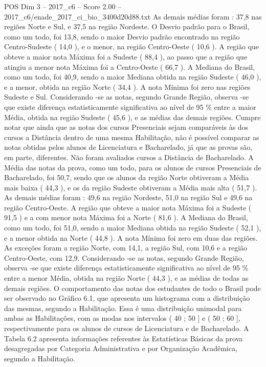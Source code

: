 \begin{textsample}{POS Dim 3 – 2017\_c6 – Score 2.00 – 2017\_c6/enade\_2017\_ci\_bio\_3400d20d88.txt}
As demais médias foram : 37,8 nas regiões Norte e Sul, e 37,5 na região Nordeste.
O Desvio padrão para o Brasil, como um todo, foi 13,8, sendo o maior Desvio padrão encontrado na região Centro-Sudeste ( 14,0 ), e o menor, na região Centro-Oeste ( 10,6 ).
A região que obteve a maior nota Máxima foi a Sudeste ( 88,4 ), ao passo que a região que atingiu a menor nota Máxima foi a Centro-Oeste ( 66,7 ).
A Mediana do Brasil, como um todo, foi 40,9, sendo a maior Mediana obtida na região Sudeste ( 46,0 ), e a menor, obtida na região Norte ( 34,4 ).
A nota Mínima foi zero nas regiões Sudeste e Sul.
Considerando -se as notas, segundo Grande Região, observa -se que existe diferença estatisticamente significativa ao nível de 95 \% entre a maior Média, obtida na região Sudeste ( 45,6 ), e as médias das demais regiões.
Cumpre notar que ainda que as notas dos cursos Presenciais sejam comparáveis às dos cursos a Distância dentro de uma mesma Habilitação, não é possível comparar as notas obtidas pelos alunos de Licenciatura e Bacharelado, já que as provas são, em parte, diferentes.
Não foram avaliados cursos a Distância de Bacharelado.
A Média das notas da prova, como um todo, para os alunos de cursos Presenciais de Bacharelado, foi 50,7, sendo que os alunos da região Norte obtiveram a Média mais baixa ( 44,3 ), e os da região Sudeste obtiveram a Média mais alta ( 51,7 ).
As demais médias foram : 49,6 na região Nordeste, 51,0 na região Sul e 49,6 na região Centro-Oeste.
A região que obteve a maior nota Máxima foi a Sudeste ( 91,5 ) e a com menor nota Máxima foi a Norte ( 81,6 ).
A Mediana do Brasil, como um todo, foi 51,0, sendo a maior Mediana obtida na região Sudeste ( 52,1 ), e a menor obtida na Norte ( 44,8 ).
A nota Mínima foi zero em duas das regiões.
As exceções foram a região Norte, com 14,1, a região Sul, com 10,6 e a região Centro-Oeste, com 12,9.
Considerando -se as notas, segundo Grande Região, observa -se que existe diferença estatisticamente significativa ao nível de 95 \% entre a menor Média, obtida na região Norte ( 44,3 ), e as médias de todas as demais regiões.
O comportamento das notas dos estudantes de todo o Brasil pode ser observado no Gráfico 6.1, que apresenta um histograma com a distribuição das mesmas, segundo a Habilitação.
Essa é uma distribuição unimodal para ambas as Habilitações, com as modas nos intervalos ( 40 ; 50 ] e ( 50 ; 60 ], respectivamente para os alunos de cursos de Licenciatura e de Bacharelado.
A Tabela 6.2 apresenta informações referentes às Estatísticas Básicas da prova desagregadas por Categoria Administrativa e por Organização Acadêmica, segundo a Habilitação.

\end{textsample}

